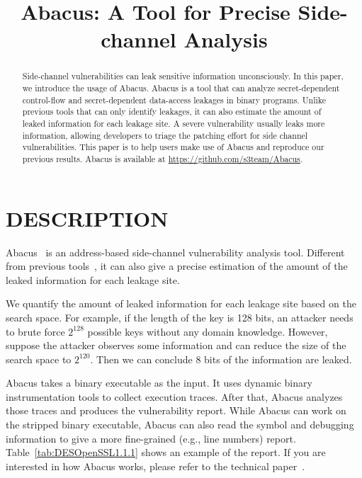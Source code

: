 \documentclass[10pt,conference]{IEEEtran}
\newcommand{\tool}{\textsf{Abacus}}
\begin{document}
\title{\tool{}: A Tool for Precise Side-channel Analysis}
\author{
}


\maketitle

\begin{abstract}
Side-channel vulnerabilities can leak sensitive information unconsciously. 
In this paper, we introduce the usage of Abacus. Abacus is a tool that can analyze secret-dependent control-flow and secret-dependent data-access leakages in binary programs. Unlike previous tools that can only identify leakages, it can also estimate the amount of leaked information for each leakage site. A severe vulnerability usually leaks more information, allowing developers to triage the patching effort for side channel vulnerabilities. This paper is to help users make use of Abacus and reproduce our previous
results. Abacus is available at \url{https://github.com/s3team/Abacus}.
\end{abstract}

\IEEEpeerreviewmaketitle
{}
\pagestyle{plain}
\section{DESCRIPTION}


Abacus~\cite{bao2021abacus} is an address-based side-channel vulnerability analysis tool. Different from previous tools~\cite{203878,236338,182946}, it can also give a precise estimation of the amount of the leaked information for each leakage site.

We quantify the amount of leaked information for each leakage site based on the search space. For example, if the length of the key is 128 bits, an attacker needs to brute force $2^{128}$ possible keys without any domain knowledge. However, suppose the attacker observes some information and can reduce the size of the search space to $2^{120}$. Then we can conclude 8 bits of the information are leaked.

\tool{} takes a binary executable as the input. It uses dynamic binary instrumentation tools to collect execution traces. After that, \tool{} analyzes those traces and produces the vulnerability report. While \tool{} can work on the stripped binary executable, \tool{} can also read the symbol and debugging information to give a more fine-grained (e.g., line numbers) report. Table~\ref{tab:DESOpenSSL1.1.1} shows an example of the report. If you are interested in how \tool{} works, please refer to the technical paper~\cite{bao2021abacus}.
\end{document}
